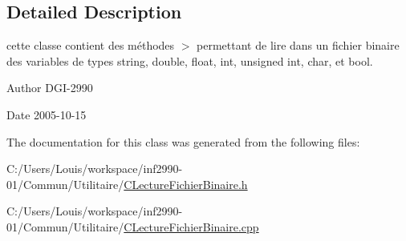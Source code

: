 \subsection{Detailed Description}
cette classe contient des méthodes $>$ permettant de lire dans un fichier binaire des variables de types string, double, float, int, unsigned int, char, et bool. 

\begin{DoxyAuthor}{Author}
D\+G\+I-\/2990 
\end{DoxyAuthor}
\begin{DoxyDate}{Date}
2005-\/10-\/15 
\end{DoxyDate}


The documentation for this class was generated from the following files\+:\begin{DoxyCompactItemize}
\item 
C\+:/\+Users/\+Louis/workspace/inf2990-\/01/\+Commun/\+Utilitaire/\hyperlink{_c_lecture_fichier_binaire_8h}{C\+Lecture\+Fichier\+Binaire.\+h}\item 
C\+:/\+Users/\+Louis/workspace/inf2990-\/01/\+Commun/\+Utilitaire/\hyperlink{_c_lecture_fichier_binaire_8cpp}{C\+Lecture\+Fichier\+Binaire.\+cpp}\end{DoxyCompactItemize}

